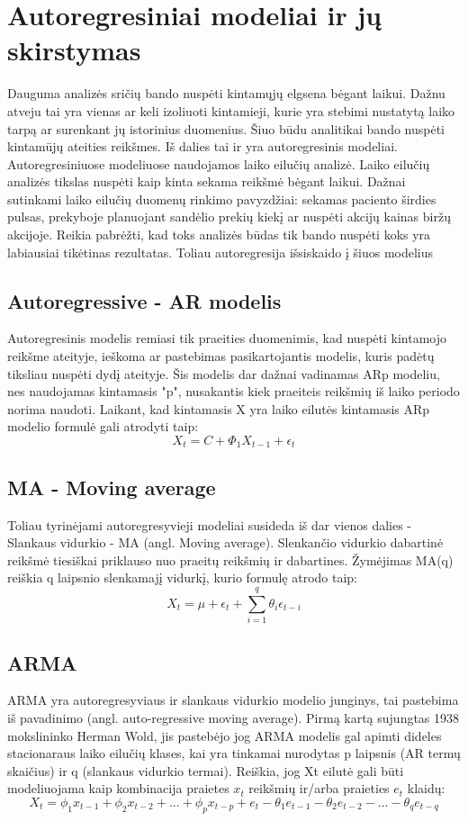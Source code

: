 \documentclass{VUMIFInfKursinis}
\begin{document}
\section{Autoregresiniai modeliai ir jų skirstymas}
Dauguma analizės sričių bando nuspėti kintamųjų elgsena bėgant laikui. Dažnu atveju tai yra vienas ar keli izoliuoti kintamieji, kurie yra stebimi nustatytą laiko
tarpą ar surenkant jų istorinius duomenius. Šiuo būdu analitikai bando nuspėti kintamūjų ateities reikšmes. Iš dalies tai ir yra autoregresinis modeliai. 
Autoregresiniuose modeliuose naudojamos laiko eilučių analizė. Laiko eilučių analizės tikslas nuspėti kaip kinta sekama reikšmė bėgant laikui. Dažnai sutinkami laiko eilučių
duomenų rinkimo pavyzdžiai: sekamas paciento širdies pulsas, prekyboje planuojant sandėlio prekių kiekį ar nuspėti akcijų kainas biržų akcijoje.
Reikia pabrėžti, kad toks analizės būdas tik bando nuspėti koks yra labiausiai tikėtinas rezultatas. Toliau autoregresija išsiskaido į šiuos modelius
\subsection{Autoregressive - AR modelis}
Autoregresinis modelis remiasi tik praeities duomenimis, kad nuspėti kintamojo reikšme ateityje, ieškoma ar pastebimas pasikartojantis modelis, kuris padėtų tiksliau nuspėti dydį ateityje.
Šis modelis dar dažnai vadinamas ARp modeliu, nes naudojamas kintamasis "p", nusakantis kiek praeiteis reikšmių iš laiko periodo norima naudoti.
Laikant, kad kintamasis X yra laiko eilutės kintamasis ARp modelio formulė gali atrodyti taip: \[X_{t} = C + \Phi _{1}X_{t-1}+\epsilon_{t} \]


\subsection {MA - Moving average}
Toliau tyrinėjami autoregresyvieji modeliai susideda iš dar vienos dalies - Slankaus vidurkio - MA (angl. Moving average). Slenkančio vidurkio dabartinė
reikšmė tiesiškai priklauso nuo praeitų reikšmių ir dabartines. Žymėjimas MA(q) reiškia q laipsnio slenkamajį vidurkį, kurio formulę atrodo taip:  
\[X_{t} = \mu + \epsilon_{t} + \sum_{i=1}^{q}\theta_{i}  \epsilon_{t-i}\]

\subsection {ARMA}
ARMA yra autoregresyviaus ir slankaus vidurkio modelio junginys, tai pastebima iš pavadinimo (angl. auto-regressive moving average). Pirmą kartą sujungtas 1938 mokslininko Herman Wold, jis
pastebėjo jog ARMA modelis gal apimti dideles stacionaraus laiko eilučių klases, kai yra tinkamai nurodytas p laipsnis (AR termų skaičius) ir q (slankaus vidurkio termai).
Reiškia, jog Xt eilutė gali būti modeliuojama kaip kombinacija praietes $x_{t}$ reikšmių ir/arba praieties $e_{t}$ klaidų:
\[X_{t} = \phi_{1}x_{t-1} + \phi_{2}x_{t-2} + ... + \phi_{p}x_{t-p} + e_{t} - \theta_{1}e_{t-1} - \theta_{2}e_{t-2} - ... - \theta_{q}e_{t-q}\]
\end{document}
